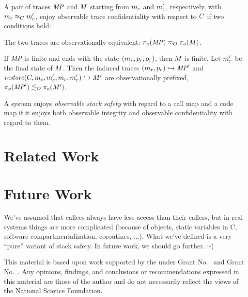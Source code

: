 \documentclass[acmsmall,review,anonymous]{acmart}\settopmatter{printfolios=true,printccs=false,printacmref=false}
\begin{document}
      A pair of traces \(\mathit{MP}\) and \(M\) starting from \(m_c\) and
      \(m_c'\), respectively, with \(m_c \approx_C m_c'\),
      enjoy observable trace confidentiality with respect to \(C\) if
      two conditions hold:

      The two traces are observationally equivalent: \(\pi_o(\mathit{MP}) \eqsim_O
      \pi_o(M)\).

      If \(\mathit{MP}\) is finite and ends with the state
      \((m_r,p_r,o_r)\), then \(M\) is finite. Let
      \(m_r'\) be the final state of \(M\). Then the induced traces
      \((m_r,p_r) \hookrightarrow \mathit{MP}'\) and
      \(\mathit{restore}(C,m_c,m_c',m_r,m_r')
      \hookrightarrow M'\) are observationally prefixed,
      \(\pi_o(\mathit{MP}') \lesssim_O \pi_o(M')\).



      A system enjoys {\em observable stack safety} with regard to a call map
      and a code map if it enjoys both observable integrity and observable
      confidentiality with regard to them.


\section{Related Work}
\label{sec:relwork}

\section{Future Work}
\label{sec:future}

We've assumed that callees always have less access than their callers, but
in real systems things are more complicated (because of objects, static
variables in C, software compartmentalization, coroutines, ...).  What we've
defined is a very ``pure'' variant of stack safety.  In future work, we
should go further. :-)


\begin{acks}                            %
  This material is based upon work supported by the
   under Grant
  No.~ and Grant
  No.~.  Any opinions, findings, and
  conclusions or recommendations expressed in this material are those
  of the author and do not necessarily reflect the views of the
  National Science Foundation.
\end{acks}
\end{document}
